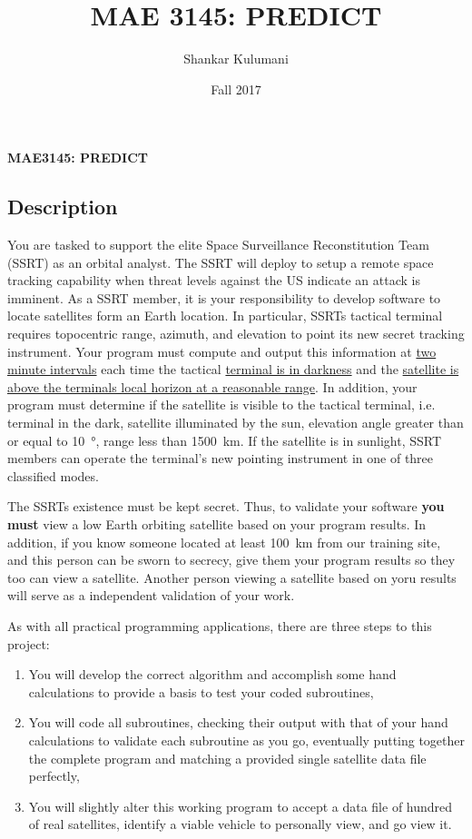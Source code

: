 \documentclass[11pt, reqno]{article}    %
\title{MAE 3145: PREDICT}
\author{Shankar Kulumani}
\date{Fall 2017}                          %
\begin{document}
\begin{center}
{\Large \textbf{MAE3145: PREDICT}}
\end{center}
\subsection*{Description}
You are tasked to support the elite Space Surveillance Reconstitution Team (SSRT) as an orbital analyst.
The SSRT will deploy to setup a remote space tracking capability when threat levels against the US indicate an attack is imminent.
As a SSRT member, it is your responsibility to develop software to locate satellites form an Earth location.
In particular, SSRTs tactical terminal requires topocentric range, azimuth, and elevation to point its new secret tracking instrument.
Your program must compute and output this information at \underline{two minute intervals} each time the tactical \underline{terminal is in darkness} and the \underline{satellite is above the terminals local horizon at a reasonable range}.
In addition, your program must determine if the satellite is visible to the tactical terminal, i.e. terminal in the dark, satellite illuminated by the sun, elevation angle greater than or equal to \SI{10}{\degree}, range less than \SI{1500}{\kilo\meter}.
If the satellite is in sunlight, SSRT members can operate the terminal's new pointing instrument in one of three classified modes.

The SSRTs existence must be kept secret.
Thus, to validate your software \textbf{you must} view a low Earth orbiting satellite based on your program results.
In addition, if you know someone located at least \SI{100}{\kilo\meter} from our training site, and this person can be sworn to secrecy, give them your program results so they too can view a satellite.
Another person viewing a satellite based on yoru results will serve as a independent validation of your work.

As with all practical programming applications, there are three steps to this project:
\begin{enumerate}
    \item You will develop the correct algorithm and accomplish some hand calculations to provide a basis to test your coded subroutines,
    \item You will code all subroutines, checking their output with that of your hand calculations to validate each subroutine as you go, eventually putting together the complete program and matching a provided single satellite data file perfectly,
    \item You will slightly alter this working program to accept a data file of hundred of real satellites, identify a viable vehicle to personally view, and go view it.
\end{enumerate}
\end{document}
